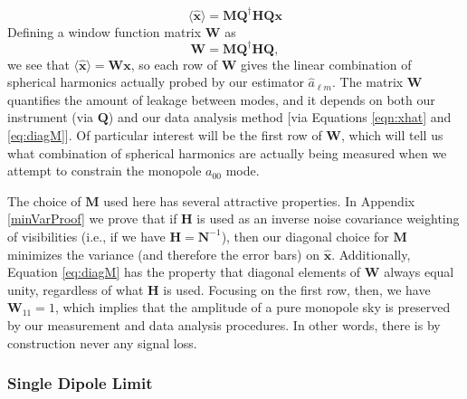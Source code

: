 \documentclass[twolcolumn,apj,iop,numberedappendix]{emulateapj}
\newcommand{\x}{\mathbf{x}}
\newcommand{\xhat}{\hat{\mathbf{x}}}
\newcommand{\N}{\mathbf{N}}
\newcommand{\Hmat}{\mathbf{H}}
\newcommand{\Q}{\mathbf{Q}}
\newcommand{\M}{\mathbf{M}}
\newcommand{\W}{\mathbf{W}}
\newcommand{\acl}[1]{{\color{red} \textbf{[ACL:  #1]}}}
\newcommand{\mep}[1]{{\color{applegreen} \textbf{[MEP:  #1]}}}
\begin{document}
\begin{equation}
\langle \xhat \rangle = \M \Q^\dagger \Hmat \Q \x
\end{equation}
Defining a window function matrix $\W$ as 
\begin{equation}
\W = \M \Q^\dagger \Hmat \Q,
\label{eq:Wform}
\end{equation}
we see that $\langle \xhat \rangle  = \W \mathbf{x}$, so each row of $\W$ gives the linear combination of spherical harmonics actually probed by our estimator $\hat{a}_{\ell m}$. The matrix $\W$ quantifies the amount of leakage between modes, and it depends on both our instrument (via $\Q$) and our data analysis method [via Equations \eqref{eqn:xhat} and \eqref{eq:diagM}]. Of particular interest will be the first row of $\W$, which will tell us what combination of spherical harmonics are actually being measured when we attempt to constrain the monopole $a_{00}$ mode.

The choice of $\M$ used here has several attractive properties. In Appendix \ref{minVarProof} we prove that if $\Hmat$ is used as an inverse noise covariance weighting of visibilities (i.e., if we have $\Hmat = \N^{-1}$), then our diagonal choice for $\M$ minimizes the variance (and therefore the error bars) on $\mathbf{\hat{x}}$. Additionally, Equation \eqref{eq:diagM} has the property that diagonal elements of $\W$ always equal unity, regardless of what $\Hmat$ is used. Focusing on the first row, then, we have $\W_{11} =1$, which implies that the amplitude of a pure monopole sky is preserved by our measurement and data analysis procedures. In other words, there is by construction never any signal loss.
%
%

\subsubsection{Single Dipole Limit}
\end{document}
